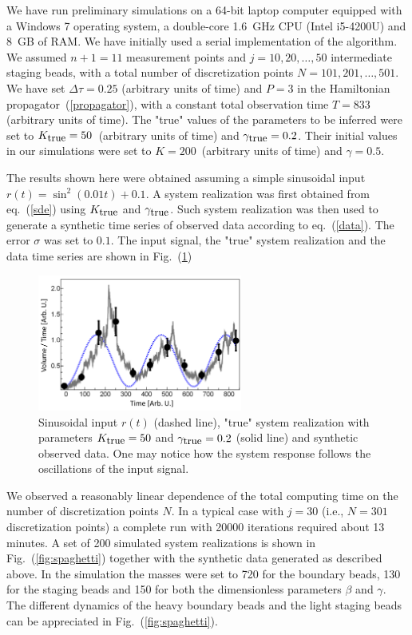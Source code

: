 \documentclass[12pt,a4paper,final]{iopart}
\begin{document}
We have run preliminary simulations on a 64-bit laptop computer equipped with a Windows 7 operating system, a double-core 1.6~GHz CPU (Intel i5-4200U) and 8~GB of RAM. We have initially used a serial implementation of the algorithm. We assumed $n+1 = 11$ measurement points and $j = 10, 20,\dots, 50$ intermediate staging beads, with a total number of discretization points $N = 101, 201, \dots, 501$. We have set $\Delta\tau = 0.25$ (arbitrary units of time) and $P = 3$ in the Hamiltonian propagator~(\ref{propagator}), with a constant total observation time $T = 833$ (arbitrary units of time). The "true" values of the parameters to be inferred were set to $K_{\mbox{\small true}}=50$~(arbitrary units of time) and $\gamma_{\mbox{\small true}} = 0.2$. Their initial values in our simulations were set to $K=200$~(arbitrary units of time) and $\gamma = 0.5$.

The results shown here were obtained assuming a simple sinusoidal input $r(t) = \sin^2 \left( 0.01 t \right) + 0.1$.
A system realization was first obtained from eq.~(\ref{sde}) using $K_{\mbox{\small true}}$ and $\gamma_{\mbox{\small true}}$. Such system realization was then used to generate a synthetic time series of observed data according to eq.~(\ref{data}). The error $\sigma$ was set to $0.1$.
The input signal, the "true" system realization and the data time series are shown in Fig.~(\ref{fig:rain_data_S})

\begin{figure}[htb!]
    \centering
    \includegraphics[width=0.6\textwidth]{Figs/FigRainData.png}
    \caption{\label{fig:rain_data_S}Sinusoidal input $r(t)$ (dashed line), "true" system realization with parameters $K_{\mbox{\small true}} = 50$ and $\gamma_{\mbox{\small true}} = 0.2$ (solid line) and synthetic observed data. One may notice how the system response follows the oscillations of the input signal.}
\end{figure}

We observed a reasonably linear dependence of the total computing time on the number of discretization points $N$. In a typical case with $j=30$ (i.e., $N = 301$ discretization points) a complete run with 20000 iterations required about 13 minutes. A set of 200 simulated system realizations is shown in Fig.~(\ref{fig:spaghetti}) together with the synthetic data generated as described above. In the simulation the masses were set to 720 for the boundary beads, 130 for the staging beads and 150 for both the dimensionless parameters $\beta$ and $\gamma$. The different dynamics of the heavy boundary beads and the light staging beads can be appreciated in Fig.~(\ref{fig:spaghetti}).
\end{document}
